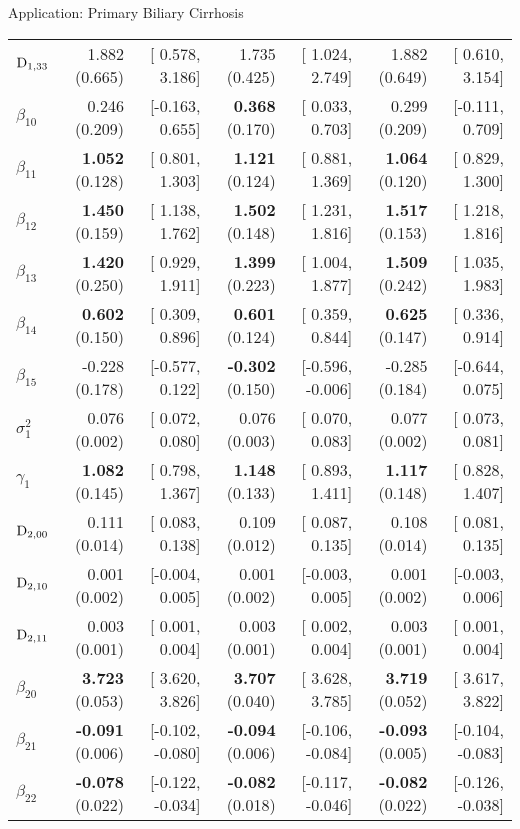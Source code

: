 \begin{chapter}{\label{cha:app-PBC}Application: Primary Biliary Cirrhosis}
\begin{table}[ht]
\begin{tabular}{lrrrrrr}
    $\mathrm{D}_{1,33}$ & 1.882 (0.665) & [ 0.578, 3.186] & 1.735 (0.425) & [ 1.024, 2.749] & 1.882 (0.649) & [ 0.610, 3.154] \\ 
    $\beta_{10}$ &  0.246 (0.209) & [-0.163, 0.655] &  \textbf{0.368} (0.170) & [ 0.033,  0.703] &  0.299 (0.209) & [-0.111, 0.709] \\ 
    $\beta_{11}$ & \textbf{ 1.052} (0.128) & [ 0.801, 1.303] &  \textbf{1.121} (0.124) & [ 0.881,  1.369] &  \textbf{1.064} (0.120) & [ 0.829, 1.300] \\ 
    $\beta_{12}$ & \textbf{ 1.450} (0.159) & [ 1.138, 1.762] &  \textbf{1.502} (0.148) & [ 1.231,  1.816] &  \textbf{1.517} (0.153) & [ 1.218, 1.816] \\ 
    $\beta_{13}$ & \textbf{ 1.420} (0.250) & [ 0.929, 1.911] &  \textbf{1.399} (0.223) & [ 1.004,  1.877] &  \textbf{1.509} (0.242) & [ 1.035, 1.983] \\ 
    $\beta_{14}$ & \textbf{ 0.602} (0.150) & [ 0.309, 0.896] &  \textbf{0.601} (0.124) & [ 0.359,  0.844] &  \textbf{0.625} (0.147) & [ 0.336, 0.914] \\ 
    $\beta_{15}$ & -0.228 (0.178) & [-0.577, 0.122] & \textbf{-0.302} (0.150) & [-0.596, -0.006] & -0.285 (0.184) & [-0.644, 0.075] \\ 
    $\sigma^2_1$ &  0.076 (0.002) & [ 0.072, 0.080] &  0.076 (0.003) & [ 0.070,  0.083] &  0.077 (0.002) & [ 0.073, 0.081] \\ 
    $\gamma_1$ &  \textbf{1.082} (0.145) & [ 0.798, 1.367] &  \textbf{1.148} (0.133) & [ 0.893,  1.411] &  \textbf{1.117} (0.148) & [ 0.828, 1.407] \\   
    \hdashline
    $\mathrm{D}_{2,00}$ & 0.111 (0.014) & [ 0.083, 0.138] & 0.109 (0.012) & [ 0.087, 0.135] & 0.108 (0.014) & [ 0.081, 0.135] \\ 
    $\mathrm{D}_{2,10}$ & 0.001 (0.002) & [-0.004, 0.005] & 0.001 (0.002) & [-0.003, 0.005] & 0.001 (0.002) & [-0.003, 0.006] \\ 
    $\mathrm{D}_{2,11}$ & 0.003 (0.001) & [ 0.001, 0.004] & 0.003 (0.001) & [ 0.002, 0.004] & 0.003 (0.001) & [ 0.001, 0.004] \\ 
    $\beta_{20}$ & \textbf{ 3.723} (0.053) & [ 3.620,  3.826] & \textbf{ 3.707} (0.040) & [ 3.628,  3.785] & \textbf{ 3.719} (0.052) & [ 3.617,  3.822] \\ 
    $\beta_{21}$ & \textbf{-0.091} (0.006) & [-0.102, -0.080] & \textbf{-0.094} (0.006) & [-0.106, -0.084] & \textbf{-0.093} (0.005) & [-0.104, -0.083] \\ 
    $\beta_{22}$ & \textbf{-0.078} (0.022) & [-0.122, -0.034] & \textbf{-0.082} (0.018) & [-0.117, -0.046] & \textbf{-0.082} (0.022) & [-0.126, -0.038] \\ 

\end{tabular}
\end{table}
\end{chapter}
